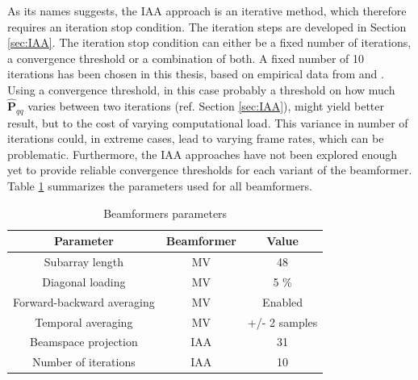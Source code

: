 As its names suggests, the IAA approach is an iterative method, which therefore requires an iteration stop condition. The iteration steps are developed in Section \ref{sec:IAA}. The iteration stop condition can either be a fixed number of iterations, a convergence threshold or a combination of both. A fixed number of 10 iterations has been chosen in this thesis, based on empirical data from \cite{Yardibi_nonparametric_IAA} and \cite{Jensen_IAA}. Using a convergence threshold, in this case probably a threshold on how much $\boldsymbol{\hat{P}}_{qq}$ varies between two iterations (ref. Section \ref{sec:IAA}), might yield better result, but to the cost of varying computational load. This variance in number of iterations could, in extreme cases, lead to varying frame rates, which can be problematic. Furthermore, the IAA approaches have not been explored enough yet to provide reliable convergence thresholds for each variant of the beamformer.
Table \ref{table:beamformers_param} summarizes the parameters used for all beamformers.

\begin{table}[!ht]
\centering
\begin{tabular}{| c | c | c |}
  \hline
  Parameter &   Beamformer   &   Value \\
  \hline
  Subarray length   &   MV &  48 \\
  Diagonal loading  &   MV &   5 \% \\
  Forward-backward averaging    &   MV  &   Enabled \\
  Temporal averaging    &   MV  &   +/- 2 samples \\
  Beamspace projection  &   IAA &   31 \\
  Number of iterations  &   IAA &   10  \\
  \hline
 \end{tabular}
\caption{Beamformers parameters}
\label{table:beamformers_param}
\end{table}

